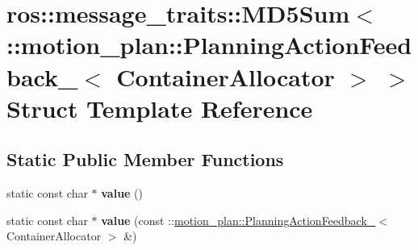 \hypertarget{structros_1_1message__traits_1_1MD5Sum_3_01_1_1motion__plan_1_1PlanningActionFeedback___3_01ContainerAllocator_01_4_01_4}{}\section{ros\+:\+:message\+\_\+traits\+:\+:M\+D5\+Sum$<$ \+:\+:motion\+\_\+plan\+:\+:Planning\+Action\+Feedback\+\_\+$<$ Container\+Allocator $>$ $>$ Struct Template Reference}
\label{structros_1_1message__traits_1_1MD5Sum_3_01_1_1motion__plan_1_1PlanningActionFeedback___3_01ContainerAllocator_01_4_01_4}
\subsection*{Static Public Member Functions}
\begin{DoxyCompactItemize}
\item 
\mbox{\label{structros_1_1message__traits_1_1MD5Sum_3_01_1_1motion__plan_1_1PlanningActionFeedback___3_01ContainerAllocator_01_4_01_4_a5251ebf7ebb34c127fdee8c8d7e9be04}} 
static const char $\ast$ {\bfseries value} ()
\item 
\mbox{\label{structros_1_1message__traits_1_1MD5Sum_3_01_1_1motion__plan_1_1PlanningActionFeedback___3_01ContainerAllocator_01_4_01_4_a16d560ba385e4e68a0d2ed9cec701171}} 
static const char $\ast$ {\bfseries value} (const \+::\hyperlink{structmotion__plan_1_1PlanningActionFeedback__}{motion\+\_\+plan\+::\+Planning\+Action\+Feedback\+\_\+}$<$ Container\+Allocator $>$ \&)
\end{DoxyCompactItemize}
